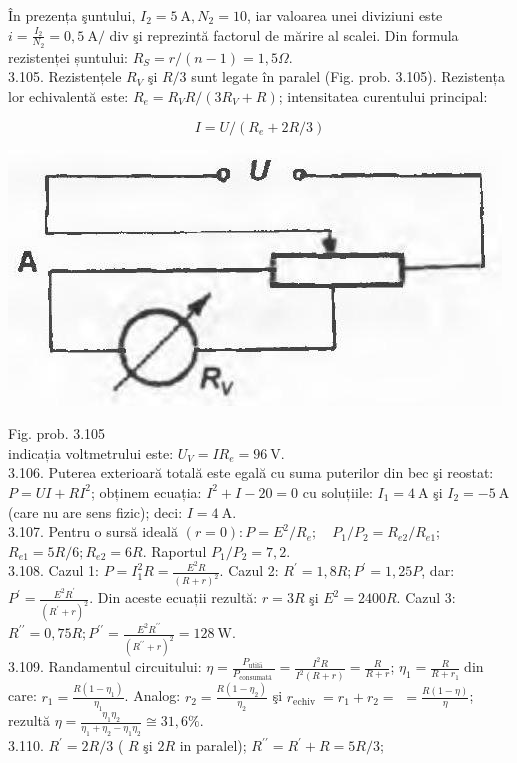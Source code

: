 \documentclass[10pt]{article}
\begin{document}
În prezența şuntului, $I_{2}=5 \mathrm{~A}, N_{2}=10$, iar valoarea unei diviziuni este $i=\frac{I_{2}}{N_{2}}=0,5 \mathrm{~A} /$ div şi reprezintă factorul de mărire al scalei. Din formula rezistenței șuntului: $R_{S}=r /(n-1)=1,5 \Omega$.\\
3.105. Rezistențele $R_{V}$ şi $R / 3$ sunt legate în paralel (Fig. prob. 3.105). Rezistența lor echivalentă este: $R_{e}=R_{V} R /\left(3 R_{V}+R\right)$; intensitatea curentului principal:

$$
I=U /\left(R_{e}+2 R / 3\right)
$$

\begin{center}
\includegraphics[max width=\textwidth]{2025_07_01_5b3ff9fa0d508c8e9f17g-362}
\end{center}

Fig. prob. 3.105\\
indicația voltmetrului este: $U_{V}=I R_{e}=96 \mathrm{~V}$.\\
3.106. Puterea exterioară totală este egală cu suma puterilor din bec şi reostat: $P=U I+R I^{2}$; obținem ecuația: $I^{2}+I-20=0$ cu soluțiile: $I_{1}=4 \mathrm{~A}$ şi $I_{2}=-5 \mathrm{~A}$ (care nu are sens fizic); deci: $I=4 \mathrm{~A}$.\\
3.107. Pentru o sursă ideală $(r=0): P=E^{2} / R_{e} ; \quad P_{1} / P_{2}=R_{e 2} / R_{e 1}$; $R_{e 1}=5 R / 6 ; R_{e 2}=6 R$. Raportul $P_{1} / P_{2}=7,2$.\\
3.108. Cazul 1: $P=I_{1}^{2} R=\frac{E^{2} R}{(R+r)^{2}}$. Cazul 2: $R^{\prime}=1,8 R ; P^{\prime}=1,25 P$, dar: $P^{\prime}=\frac{E^{2} R^{\prime}}{\left(R^{\prime}+r\right)^{2}}$. Din aceste ecuații rezultă: $r=3 R$ şi $E^{2}=2400 R$. Cazul 3: $R^{\prime \prime}=0,75 R ; P^{\prime \prime}=\frac{E^{2} R^{\prime \prime}}{\left(R^{\prime \prime}+r\right)^{2}}=128 \mathrm{~W}$.\\
3.109. Randamentul circuitului: $\eta=\frac{P_{\text {utilā }}}{P_{\text {consumată }}}=\frac{I^{2} R}{I^{2}(R+r)}=\frac{R}{R+r}$; $\eta_{1}=\frac{R}{R+r_{1}} \operatorname{din}$ care: $r_{1}=\frac{R\left(1-\eta_{1}\right)}{\eta_{1}}$. Analog: $r_{2}=\frac{R\left(1-\eta_{2}\right)}{\eta_{2}}$ şi $r_{\text {echiv }}=r_{1}+r_{2}=$ $=\frac{R(1-\eta)}{\eta}$; rezultă $\eta=\frac{\eta_{1} \eta_{2}}{\eta_{1}+\eta_{2}-\eta_{1} \eta_{2}} \cong 31,6 \%$.\\
3.110. $R^{\prime}=2 R / 3$ ( $R$ şi $2 R$ in paralel); $R^{\prime \prime}=R^{\prime}+R=5 R / 3$;
\end{document}

